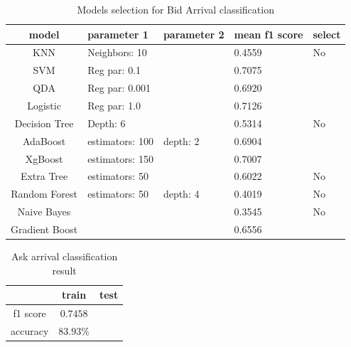 \documentclass[letterpaper,12pt]{article}
\numberwithin{equation}{section}
\begin{document}
\begin{table}
    \centering
    \begin{tabular}{c |l| l| l| l }
    \hline \hline 
         model & parameter 1 & parameter 2 & mean f1 score & select   \\ \hline 
         KNN          & Neighbors: 10  &          & 0.4559           & No  \\ \hline 
         SVM          & Reg par: 0.1   &          & 0.7075           &\color{red}{Yes}  \\ \hline 
         QDA          & Reg par: 0.001 &          & 0.6920           &\color{red}{Yes}   \\ \hline  
         Logistic     & Reg par: 1.0   &          & 0.7126           &\color{red}{Yes}   \\ \hline 
         Decision Tree& Depth: 6       &          & 0.5314           & No  \\ \hline 
         AdaBoost     & estimators: 100& depth: 2 & 0.6904           &\color{red}{Yes}   \\ \hline 
         XgBoost      & estimators: 150&          & 0.7007           &\color{red}{Yes}   \\ \hline 
         Extra  Tree  & estimators: 50 &          & 0.6022           & No  \\ \hline 
         Random Forest& estimators: 50 & depth: 4 & 0.4019           & No  \\ \hline 
         Naive Bayes  &                &          & 0.3545           & No  \\ \hline 
         Gradient Boost&               &          & 0.6556           &\color{red}{Yes}   \\ \hline \hline
    \end{tabular}
    \caption{Models selection for Bid Arrival classification}
    \label{sec4:tab:ask_model_select}
\end{table}

\begin{table}[H]
    \centering
    \caption{Ask arrival classification result}
    \begin{tabular}{c c c}
       \hline \hline 
                 & train      & test     \\ \hline
        f1 score & $0.7458$   & \color{red}{$0.6843$}  \\ 
        accuracy & $83.93\%$  & \color{red}{$81.47\%$} \\ \hline \hline 
    \end{tabular}
    \label{sec4:tab:ask_result}
\end{table}
    
\end{document}
